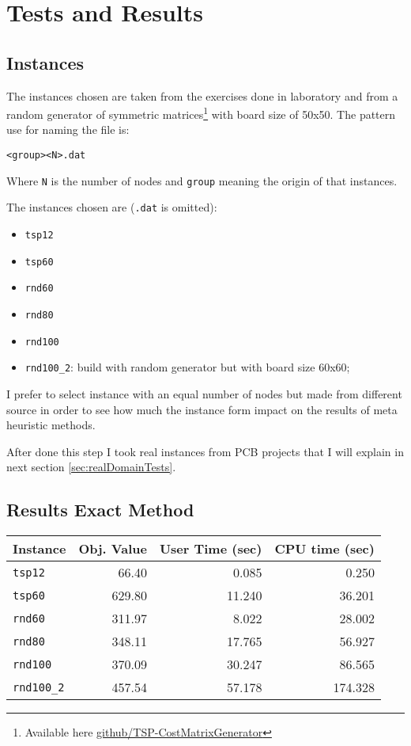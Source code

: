 \section{Tests and Results}

\subsection{Instances}
	The instances chosen are taken from the exercises done in laboratory and from a random generator of symmetric matrices\footnote{Available here \href{https://github.com/Gheeroppa/TSP_CostMatrixGenerator}{github/TSP-CostMatrixGenerator}} with board size of 50x50. The pattern use for naming the file is:
	\begin{center}
		\verb|<group><N>.dat|
	\end{center}
	Where \verb|N| is the number of nodes and \verb|group| meaning the origin of that instances.
	
	The instances chosen are (\verb|.dat| is omitted):
	\begin{itemize}
		\item \verb|tsp12|
		\item \verb|tsp60|
		\item \verb|rnd60|
		\item \verb|rnd80|
		\item \verb|rnd100|
		\item \verb|rnd100_2|: build with random generator but with board size 60x60;
	\end{itemize}
	I prefer to select instance with an equal number of nodes but made from different source in order to see how much the instance form impact on the results of meta heuristic methods.
	
	After done this step I took real instances from PCB projects that I will explain in next section \ref{sec:realDomainTests}. 

\subsection{Results Exact Method}

	\begin{center}
		\begin{tabular}{lrrr}
			\toprule
			\textbf{Instance} & \textbf{Obj. Value} & \textbf{User Time (sec)} & \textbf{CPU time (sec)} \\
			\midrule
			\verb|tsp12| & 66.40 & 0.085 & 0.250 \\
			\verb|tsp60| & 629.80 & 11.240 & 36.201 \\
			
			\verb|rnd60| & 311.97 & 8.022 & 28.002 \\
			\verb|rnd80| & 348.11 & 17.765 & 56.927 \\
			\verb|rnd100| & 370.09 & 30.247 & 86.565 \\
			\verb|rnd100_2| & 457.54 & 57.178 & 174.328 \\
			\bottomrule
		\end{tabular}
	\end{center}
	

